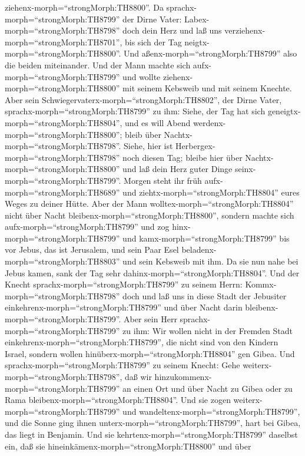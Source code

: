 ziehenx-morph=``strongMorph:TH8800''. Da
sprachx-morph=``strongMorph:TH8799'' der Dirne Vater:
Labex-morph=``strongMorph:TH8798'' doch dein Herz und laß uns
verziehenx-morph=``strongMorph:TH8701'', bis sich der Tag
neigtx-morph=``strongMorph:TH8800''. Und
aßenx-morph=``strongMorph:TH8799'' also die beiden miteinander.
 Und der Mann machte sich aufx-morph=``strongMorph:TH8799''
und wollte ziehenx-morph=``strongMorph:TH8800'' mit seinem Kebsweib und
mit seinem Knechte. Aber sein
Schwiegervaterx-morph=``strongMorph:TH8802'', der Dirne Vater,
sprachx-morph=``strongMorph:TH8799'' zu ihm: Siehe, der Tag hat sich
geneigtx-morph=``strongMorph:TH8804'', und es will Abend
werdenx-morph=``strongMorph:TH8800''; bleib über
Nachtx-morph=``strongMorph:TH8798''. Siehe, hier ist
Herbergex-morph=``strongMorph:TH8798'' noch diesen Tag; bleibe hier über
Nachtx-morph=``strongMorph:TH8800'' und laß dein Herz guter Dinge
seinx-morph=``strongMorph:TH8799''. Morgen steht ihr früh
aufx-morph=``strongMorph:TH8689'' und
ziehtx-morph=``strongMorph:TH8804'' eures Weges zu deiner Hütte.
 Aber der Mann wolltex-morph=``strongMorph:TH8804'' nicht
über Nacht bleibenx-morph=``strongMorph:TH8800'', sondern machte sich
aufx-morph=``strongMorph:TH8799'' und zog
hinx-morph=``strongMorph:TH8799'' und kamx-morph=``strongMorph:TH8799''
bis vor Jebus, das ist Jerusalem, und sein Paar Esel
beladenx-morph=``strongMorph:TH8803'' und sein Kebsweib mit ihm.
 Da sie nun nahe bei Jebus kamen, sank der Tag sehr
dahinx-morph=``strongMorph:TH8804''. Und der Knecht
sprachx-morph=``strongMorph:TH8799'' zu seinem Herrn:
Kommx-morph=``strongMorph:TH8798'' doch und laß uns in diese Stadt der
Jebusiter einkehrenx-morph=``strongMorph:TH8799'' und über Nacht darin
bleibenx-morph=``strongMorph:TH8799''.  Aber sein Herr
sprachx-morph=``strongMorph:TH8799'' zu ihm: Wir wollen nicht in der
Fremden Stadt einkehrenx-morph=``strongMorph:TH8799'', die nicht sind
von den Kindern Israel, sondern wollen
hinüberx-morph=``strongMorph:TH8804'' gen Gibea.  Und
sprachx-morph=``strongMorph:TH8799'' zu seinem Knecht: Gehe
weiterx-morph=``strongMorph:TH8798'', daß wir
hinzukommenx-morph=``strongMorph:TH8799'' an einen Ort und über Nacht zu
Gibea oder zu Rama bleibenx-morph=``strongMorph:TH8804''. 
Und sie zogen weiterx-morph=``strongMorph:TH8799'' und
wandeltenx-morph=``strongMorph:TH8799'', und die Sonne ging ihnen
unterx-morph=``strongMorph:TH8799'', hart bei Gibea, das liegt in
Benjamin.  Und sie kehrtenx-morph=``strongMorph:TH8799''
daselbst ein, daß sie hineinkämenx-morph=``strongMorph:TH8800'' und über
